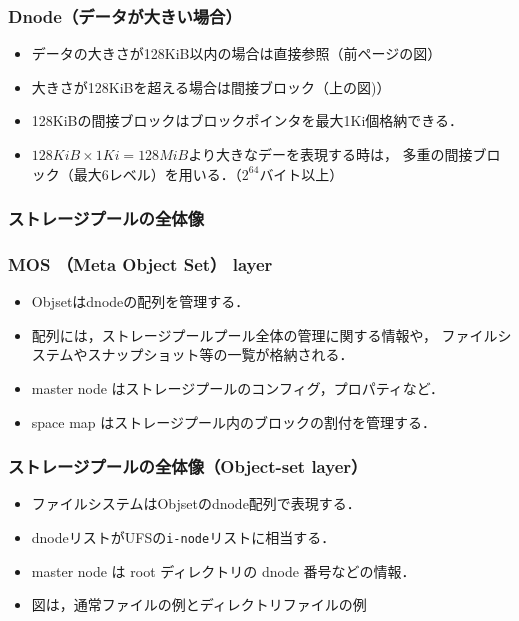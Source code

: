 \documentclass[handout]{beamer}                   %
\begin{document}
\begin{frame}[fragile]
  \frametitle{Dnode（データが大きい場合）}
  \centerline{}
  \vfill
  \begin{itemize}
  \item データの大きさが128KiB以内の場合は直接参照（前ページの図）
  \item 大きさが128KiBを超える場合は間接ブロック（上の図)）
  \item 128KiBの間接ブロックはブロックポインタを最大1Ki個格納できる．
  \item $128KiB \times 1Ki = 128MiB$より大きなデーを表現する時は，
    多重の間接ブロック（最大6レベル）を用いる．（$2^{64}$バイト以上）
  \end{itemize}
  \vfill
\end{frame}

\begin{frame}[fragile]
  \frametitle{ストレージプールの全体像}
  \vfill
\end{frame}

\begin{frame}[fragile]
  \frametitle{MOS （Meta Object Set） layer}
  \begin{itemize}
  \item Objsetはdnodeの配列を管理する．
  \item 配列には，ストレージプールプール全体の管理に関する情報や，
    ファイルシステムやスナップショット等の一覧が格納される．
  \item master node はストレージプールのコンフィグ，プロパティなど．
  \item space map はストレージプール内のブロックの割付を管理する．
  \end{itemize}
  \vfill
\end{frame}

\begin{frame}[fragile]
  \frametitle{ストレージプールの全体像（Object-set layer）}
  \begin{itemize}
  \item ファイルシステムはObjsetのdnode配列で表現する．
  \item dnodeリストがUFSの\texttt{i-node}リストに相当する．
  \item master node は root ディレクトリの dnode 番号などの情報．
  \item 図は，通常ファイルの例とディレクトリファイルの例
  \end{itemize}
  \vfill
\end{frame}
\end{document}
